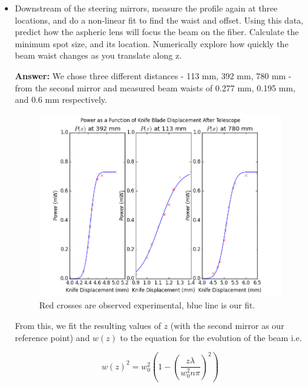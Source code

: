 \documentclass[10pt,a4paper]{article}
\begin{document}
\begin{itemize}
\item Downstream of the steering mirrors, measure the profile again at three locations, and do a non-linear fit to find the waist and offset. Using this data, predict how the aspheric lens will focus the beam on the fiber. Calculate the minimum spot size, and its location. Numerically explore how quickly the beam waist changes as you translate along z.

\textbf{Answer: }We chose three different distances - 113 mm, 392 mm, 780 mm - from the second mirror and measured beam waists of 0.277 mm, 0.195 mm, and 0.6 mm respectively. 
\begin{figure}[H]
\centering
\includegraphics[scale=0.6]{../Analysis/beam_profile_after.png}
\caption{Red crosses are observed experimental, blue line is our fit.}
\end{figure}

From this, we fit the resulting values of $z$ (with the second mirror as our reference point) and $w({z})$ to the equation for the evolution of the beam i.e.

$$w(z)^{2} = w_{0}^{2}\left(1 - \left(\dfrac{z\lambda}{w_{0}^{2}n\pi}\right)^{2}\right)$$


\end{itemize}
\end{document}
